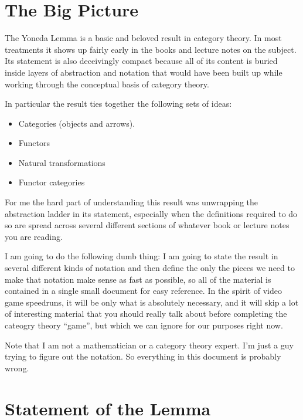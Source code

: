 
\section{The Big Picture}

The Yoneda Lemma is a basic and beloved result in category theory. In most treatments it
shows up fairly early in the books and lecture notes on the subject. Its statement is also
deceivingly compact because all of its content is buried inside layers of abstraction and
notation that would have been built up while working through the conceptual basis of
category theory.

In particular the result ties together the following sets of ideas:

\begin{itemize}

\item Categories (objects and arrows).
\item Functors
\item Natural transformations
\item Functor categories

\end{itemize}

\noindent
For me the hard part of understanding this result was unwrapping the abstraction ladder in
its statement, especially when the definitions required to do so are spread across several
different sections of whatever book or lecture notes you are reading.

I am going to do the following dumb thing: I am going to state the result in several
different kinds of notation and then define the only the pieces we need to make that
notation make sense as fast as possible, so all of the material is contained in a single
small document for easy reference. In the spirit of video game speedruns, it will be only
what is absolutely necessary, and it will skip a lot of interesting material that you
should really talk about before completing the cateogry theory ``game'', but which we can
ignore for our purposes right now.

Note that I am not a mathematician or a category theory expert. I'm just a guy trying to
figure out the notation. So everything in this document is probably wrong.

\section{Statement of the Lemma}

